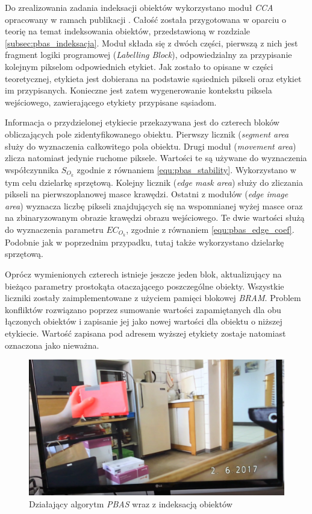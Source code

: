 Do zrealizowania zadania indeksacji obiektów wykorzystano moduł \textit{CCA} opracowany w ramach publikacji \cite{kryjak_14_pbas}. 
Całość została przygotowana w oparciu o teorię na temat indeksowania obiektów, przedstawioną w rozdziale \ref{subsec:pbas_indeksacja}. 
Moduł składa się z dwóch części, pierwszą z nich jest fragment logiki programowej (\textit{Labelling Block}), odpowiedzialny za przypisanie kolejnym pikselom odpowiednich etykiet. %
Jak zostało to opisane w części teoretycznej, etykieta jest dobierana na podstawie sąsiednich pikseli oraz etykiet im przypisanych. 
Konieczne jest zatem wygenerowanie kontekstu piksela wejściowego, zawierającego etykiety przypisane sąsiadom.

Informacja o przydzielonej etykiecie przekazywana jest do czterech bloków obliczających pole zidentyfikowanego obiektu. 
Pierwszy licznik (\textit{segment area} służy do wyznaczenia całkowitego pola obiektu. 
Drugi moduł (\textit{movement area}) zlicza natomiast jedynie ruchome piksele. 
Wartości te są używane do wyznaczenia współczynnika $S_{O_k}$ zgodnie z równaniem \ref{equ:pbas_stability}. 
Wykorzystano w tym celu dzielarkę sprzętową. 
Kolejny licznik (\textit{edge mask area}) służy do zliczania pikseli na pierwszoplanowej masce krawędzi. 
Ostatni z modułów (\textit{edge image area}) wyznacza liczbę pikseli znajdujących się na wspomnianej wyżej masce oraz na zbinaryzowanym obrazie krawędzi obrazu wejściowego. 
Te dwie wartości służą do wyznaczenia parametru $EC_{O_k}$, zgodnie z równaniem \ref{equ:pbas_edge_coef}. 
Podobnie jak w poprzednim przypadku, tutaj także wykorzystano dzielarkę sprzętową.

Oprócz wymienionych czterech istnieje jeszcze jeden blok, aktualizujący na bieżąco parametry prostokąta otaczającego poszczególne obiekty. Wszystkie liczniki zostały zaimplementowane z użyciem pamięci blokowej \textit{BRAM}. 
Problem konfliktów rozwiązano poprzez sumowanie wartości zapamiętanych dla obu łączonych obiektów i zapisanie jej jako nowej wartości dla obiektu o niższej etykiecie. 
Wartość zapisana pod adresem wyższej etykiety zostaje natomiast oznaczona jako nieważna.

	\begin{figure}[h!]
		\centering
		\includegraphics[scale=0.2]{img/4/pbas_plus_example.png}
		\caption{Działający algorytm \textit{PBAS} wraz z indeksacją obiektów}
		\label{fig:pbas_plus_demo}
	\end{figure}



